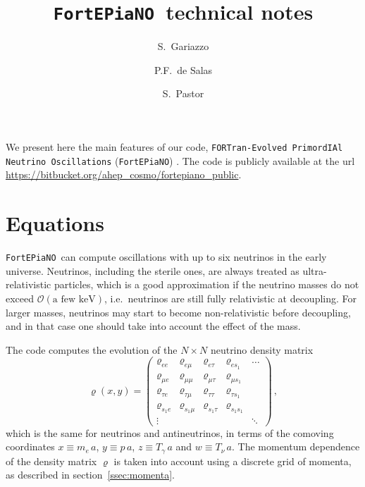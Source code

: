 \documentclass[notitlepage,showpacs,preprintnumbers,amsmath,amssymb,superscriptaddress,prd,onecolumn]{revtex4-1}
\newcommand{\fortepiano}{\texttt{FortEPiaNO}}
\begin{document}
\title{\boldmath \fortepiano\ technical notes}

\author{S.\ Gariazzo}

\author{P.F.\ de Salas}

\author{S.\ Pastor}


\maketitle


We present here the main features of
our code, \texttt{FORTran-Evolved PrimordIAl Neutrino Oscillations}
(\fortepiano) \cite{Gariazzo:2019gyi}.
The code is publicly available at the url
\url{https://bitbucket.org/ahep_cosmo/fortepiano_public}.


\section{Equations}
\label{sec:equations}
\fortepiano\ can compute oscillations with up to six neutrinos in the early universe.
Neutrinos, including the sterile ones, are always treated as ultra-relativistic particles, which is a good approximation if the
neutrino masses do not exceed $\mathcal{O}(\mbox{a few keV})$,
i.e.\ neutrinos are still fully relativistic at decoupling.
For larger masses, neutrinos may start to become non-relativistic before decoupling,
and in that case one should take into account the effect of the mass.

The code computes the evolution of the
$N\times N$ neutrino density matrix
\cite{deSalas:2016ztq,Mirizzi:2012we,Saviano:2013ktj,Mangano:2001iu}
\begin{equation}\label{eq:varrho-B4}
\varrho(x, y)
=
\left(
\begin{array}{ccccc}
\varrho_{ee}&\varrho_{e\mu}&\varrho_{e\tau}&\varrho_{es_1}&\ldots\\
\varrho_{\mu e}&\varrho_{\mu\mu}&\varrho_{\mu\tau}&\varrho_{\mu s_1}&\\
\varrho_{\tau e}&\varrho_{\tau\mu}&\varrho_{\tau\tau}&\varrho_{\tau s_1}&\\
\varrho_{s_1e}&\varrho_{s_1\mu}&\varrho_{s_1\tau}&\varrho_{s_1s_1}&\\
\vdots&&&&\ddots
\end{array}
\right)\,,
\end{equation}
which is the same for neutrinos and antineutrinos,
in terms of the comoving coordinates
$x\equiv m_e\, a$, $y\equiv p\, a$, $z\equiv T_\gamma\, a$ and $w\equiv T_\nu\,a$.
The momentum dependence of the density matrix $\varrho$ is taken into account
using a discrete grid of momenta, as described in section~\ref{ssec:momenta}.
\end{document}
